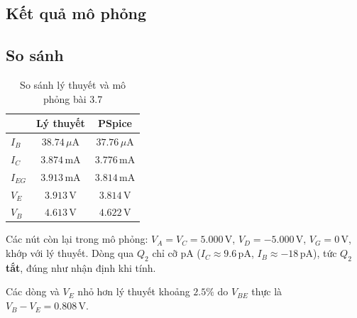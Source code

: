 \subsection{Kết quả mô phỏng}

\subsection{So sánh}
\begin{table}[H]
\centering
\begin{tabular}{l|c|c}
\toprule
 & Lý thuyết & PSpice \\
\midrule
$I_B$ & $38.74\,\mu\text{A}$ & $37.76\,\mu\text{A}$ \\
$I_C$ & $3.874\,\text{mA}$ & $3.776\,\text{mA}$ \\
$I_{EG}$ & $3.913\,\text{mA}$ & $3.814\,\text{mA}$ \\
$V_E$ & $3.913\,\text{V}$ & $3.814\,\text{V}$ \\
$V_B$ & $4.613\,\text{V}$ & $4.622\,\text{V}$ \\
\bottomrule
\end{tabular}
\caption{So sánh lý thuyết và mô phỏng bài 3.7}
\end{table}

Các nút còn lại trong mô phỏng: $V_A = V_C = 5.000\,\text{V}$, $V_D = -5.000\,\text{V}$, $V_G = 0\,\text{V}$, khớp với lý thuyết. Dòng qua $Q_2$ chỉ cỡ pA ($I_C \approx 9.6\,\text{pA}$, $I_B \approx -18\,\text{pA}$), tức $Q_2$ \textbf{tắt}, đúng như nhận định khi tính.

Các dòng và $V_E$ nhỏ hơn lý thuyết khoảng $2.5\%$ do $V_{BE}$ thực là $V_B - V_E = 0.808\,\text{V}$.
